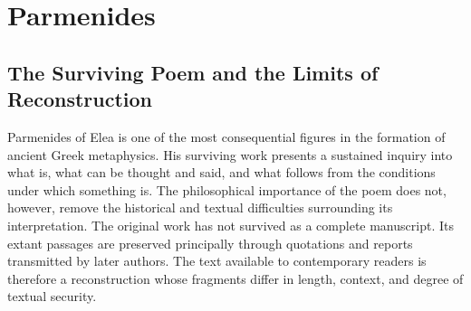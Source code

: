 
%
%
%
%
%

\section{Parmenides}
\label{sec:ch08-parmenides}

\newcommand{\ParmenidesParagraphAnchor}[1]{%
    \phantomsection\label{para:#1}%
}

\nocite{ParmenidesFragments,CoxonParmenides2009,PalmerParmenides2009,CurdParmenidesSEP,AristotleMetaphysics,AristotlePhysics}


\subsection{The Surviving Poem and the Limits of Reconstruction}

\ParmenidesParagraphAnchor{VS.B01.P01.C08.S02.SS01.P001}

Parmenides of Elea is one of the most consequential figures in the
formation of ancient Greek metaphysics. His surviving work presents
a sustained inquiry into what is, what can be thought and said,
and what follows from the conditions under which something is.
The philosophical importance of the poem does not, however,
remove the historical and textual difficulties surrounding its
interpretation. The original work has not survived as a complete
manuscript. Its extant passages are preserved principally through
quotations and reports transmitted by later authors. The text
available to contemporary readers is therefore a reconstruction
whose fragments differ in length, context, and degree of textual
security.

